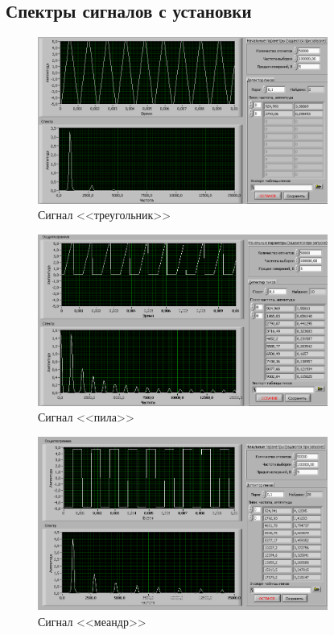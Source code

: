 \subsection{Спектры сигналов с установки}
\begin{figure}[H]
	\centering
	\includegraphics[width=0.85\textwidth]{pic/sig/triangle.png}
	\caption{Сигнал <<треугольник>>}
	
\end{figure}
\begin{figure}[H]
	\centering
	\includegraphics[width=0.85\textwidth]{pic/sig/pila.png}
	\caption{Сигнал <<пила>>}
	
\end{figure}
\begin{figure}[H]
	\centering
	\includegraphics[width=0.85\textwidth]{pic/sig/meandr.png}
	\caption{Сигнал <<меандр>>}
\end{figure}

